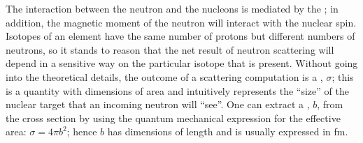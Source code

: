 The interaction between the neutron and the nucleons is mediated by the ; in addition, the magnetic moment of the neutron will interact with the nuclear spin.  Isotopes of an element have the same number of protons but different numbers of neutrons, so it stands to reason that the net result of neutron scattering will depend in a sensitive way on the particular isotope that is present.  Without going into the theoretical details, the outcome of a scattering computation is a , $\sigma$; this is a quantity with dimensions of area and intuitively represents the ``size'' of the nuclear target that an incoming neutron will ``see''.  One can extract a , $b$, from the cross section by using the quantum mechanical expression for the effective area: $\sigma = 4\pi b^2$; hence $b$ has dimensions of length and is usually expressed in fm. 
 
